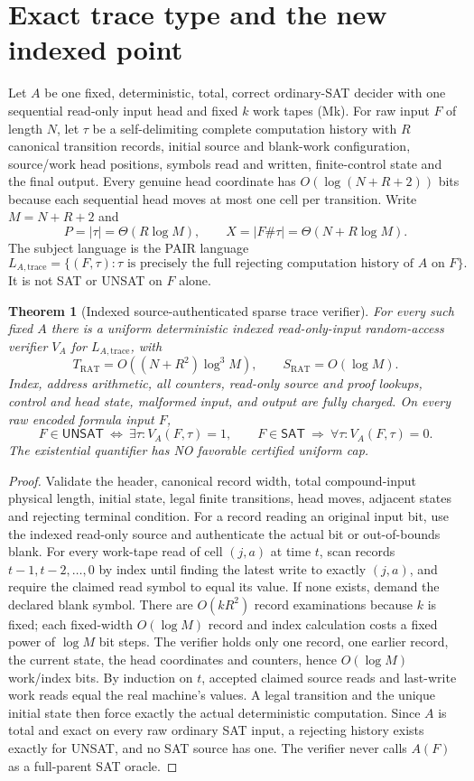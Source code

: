 \documentclass[11pt]{article}
\newtheorem{theorem}{Theorem}
\newcommand{\SAT}{\mathsf{SAT}}
\newcommand{\UNSAT}{\mathsf{UNSAT}}
\begin{document}
\section{Exact trace type and the new indexed point}
Let $A$ be one fixed, deterministic, total, correct ordinary-SAT decider
with one sequential read-only input head and fixed $k$ work tapes (Mk).
For raw input $F$ of length $N$, let $\tau$ be a self-delimiting
complete computation history with $R$ canonical transition records,
initial source and blank-work configuration, source/work head positions,
symbols read and written, finite-control state and the final output.
Every genuine head coordinate has $O(\log(N+R+2))$ bits because each
sequential head moves at most one cell per transition.
Write $M=N+R+2$ and
\[
 P=|\tau|=\Theta(R\log M),\qquad
 X=|F\#\tau|=\Theta(N+R\log M).
\]
The subject language is the PAIR language
\[
 L_{A,\mathrm{trace}}=\{(F,\tau):\tau\text{ is precisely the full
 rejecting computation history of }A\text{ on }F\}.
\]
It is not SAT or UNSAT on $F$ alone.

\begin{theorem}[Indexed source-authenticated sparse trace verifier]
For every such fixed $A$ there is a uniform deterministic indexed
read-only-input random-access verifier $V_A$ for
$L_{A,\mathrm{trace}}$, with
\[
 T_{\mathrm{RAT}}=O((N+R^2)\log^3 M),\qquad
 S_{\mathrm{RAT}}=O(\log M).
\]
Index, address arithmetic, all counters, read-only source and proof lookups,
control and head state, malformed input, and output are fully charged.
On every raw encoded formula input $F$,
\[
 F\in\UNSAT\ \Longleftrightarrow\
 \exists\tau: V_A(F,\tau)=1,\qquad
 F\in\SAT\ \Longrightarrow\
 \forall\tau:V_A(F,\tau)=0.
\]
The existential quantifier has NO favorable certified uniform cap.
\end{theorem}
\begin{proof}
Validate the header, canonical record width, total compound-input physical
length, initial state, legal finite transitions, head moves, adjacent states
and rejecting terminal condition. For a record reading an original input
bit, use the indexed read-only source and authenticate the actual bit or
out-of-bounds blank. For every work-tape read of cell $(j,a)$ at time $t$,
scan records $t-1,t-2,\ldots,0$ by index until finding the latest write
to exactly $(j,a)$, and require the claimed read symbol to equal its value.
If none exists, demand the declared blank symbol. There are $O(kR^2)$
record examinations because $k$ is fixed; each fixed-width $O(\log M)$
record and index calculation costs a fixed power of $\log M$ bit steps.
The verifier holds only one record, one earlier record, the current state,
the head coordinates and counters, hence $O(\log M)$ work/index bits.
By induction on $t$, accepted claimed source reads and last-write work
reads equal the real machine's values. A legal transition and the unique
initial state then force exactly the actual deterministic computation.
Since $A$ is total and exact on every raw ordinary SAT input, a rejecting
history exists exactly for UNSAT, and no SAT source has one. The
verifier never calls $A(F)$ as a full-parent SAT oracle.
\end{proof}
\end{document}
